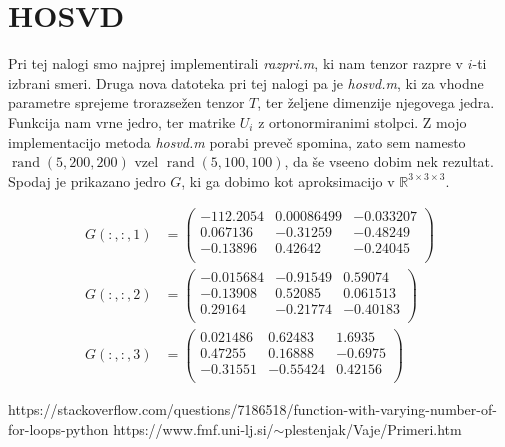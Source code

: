 \documentclass[a4paper,12pt]{article}
\def\R{\mathbb{R}} %
\DeclareMathOperator{\rand}{rand}
\begin{document}
\section{HOSVD}
Pri tej nalogi smo najprej implementirali \emph{razpri.m}, ki nam tenzor razpre v $i$-ti izbrani smeri.  Druga nova datoteka pri tej nalogi pa je \emph{hosvd.m}, ki za vhodne parametre sprejeme trorazsežen tenzor $T$, ter željene dimenzije njegovega jedra. Funkcija nam vrne jedro, ter matrike $U_i$ z ortonormiranimi stolpci. Z mojo implementacijo metoda \emph{hosvd.m} porabi preveč spomina, zato sem namesto $\rand(5, 200, 200)$ vzel $\rand(5, 100, 100)$, da še vseeno dobim nek rezultat. Spodaj je prikazano jedro $G$, ki ga dobimo kot aproksimacijo v $\R^{3 \times 3 \times 3}$. 

\begin{align*}
G(:, :, 1) &= 
\begin{pmatrix}
-112.2054&0.00086499&-0.033207\\
0.067136&-0.31259&-0.48249\\
-0.13896&0.42642&-0.24045\\
\end{pmatrix}\\
G(:, :, 2) &= 
\begin{pmatrix}
-0.015684&-0.91549&0.59074\\
-0.13908&0.52085&0.061513\\
0.29164&-0.21774&-0.40183\\
\end{pmatrix}\\
G(:, :, 3) &= 
\begin{pmatrix}
0.021486&0.62483&1.6935\\
0.47255&0.16888&-0.6975\\
-0.31551&-0.55424&0.42156\\
\end{pmatrix}
\end{align*}



\begin{thebibliography}{1}
	https://stackoverflow.com/questions/7186518/function-with-varying-number-of-for-loops-python
	https://www.fmf.uni-lj.si/$\sim$plestenjak/Vaje/Primeri.htm
\end{thebibliography}
\end{document}
